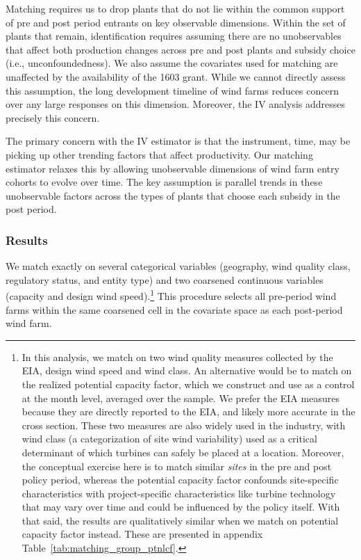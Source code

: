 \documentclass[12pt]{article}
\begin{document}
Matching requires us to drop plants that do not lie within the common support of pre and post period entrants on key observable dimensions. Within the set of plants that remain, identification requires assuming there are no unobservables that affect both production changes across pre and post plants and subsidy choice (i.e., unconfoundedness). We also assume the covariates used for matching are unaffected by the availability of the 1603 grant. While we cannot directly assess this assumption, the long development timeline of wind farms reduces concern over any large responses on this dimension. Moreover, the IV analysis addresses precisely this concern.

The primary concern with the IV estimator is that the instrument, time, may be picking up other trending factors that affect productivity. Our matching estimator relaxes this by allowing unobservable dimensions of wind farm entry cohorts to evolve over time. The key assumption is parallel trends in these unobservable factors across the types of plants that choose each subsidy in the post period. 

\subsubsection*{Results \label{sec:results:matching}}

We match exactly on several categorical variables (geography, wind quality class, regulatory status, and entity type) and two coarsened continuous variables (capacity and design wind speed).\footnote{In this analysis, we match on two wind quality measures collected by the EIA, design wind speed and wind class. An alternative would be to match on the realized potential capacity factor, which we construct and use as a control at the month level, averaged over the sample. We prefer the EIA measures because they are directly reported to the EIA, and likely more accurate in the cross section. These two measures are also widely used in the industry, with wind class (a categorization of site wind variability) used as a critical determinant of which turbines can safely be placed at a location. Moreover, the conceptual exercise here is to match similar \textit{sites} in the pre and post policy period, whereas the potential capacity factor confounds site-specific characteristics with project-specific characteristics like turbine technology that may vary over time and could be influenced by the policy itself. With that said, the results are qualitatively similar when we match on potential capacity factor instead. These are presented in appendix Table~\ref{tab:matching_group_ptnlcf}.} This procedure selects all pre-period wind farms within the same coarsened cell in the covariate space as each post-period wind farm.
\end{document}
